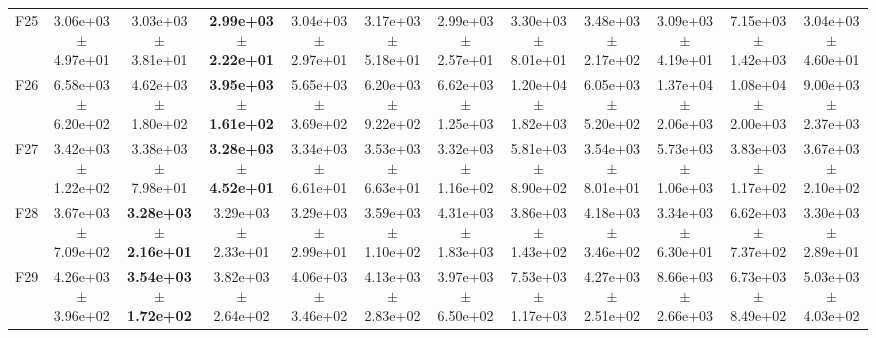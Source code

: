 \begin{table}
{\begin{tabular}{lccccccccccc}
F25 & 3.06e+03 $\pm$ 4.97e+01 & 3.03e+03 $\pm$ 3.81e+01 & \textbf{2.99e+03 $\pm$ 2.22e+01} & 3.04e+03 $\pm$ 2.97e+01 & 3.17e+03 $\pm$ 5.18e+01 & 2.99e+03 $\pm$ 2.57e+01 & 3.30e+03 $\pm$ 8.01e+01 & 3.48e+03 $\pm$ 2.17e+02 & 3.09e+03 $\pm$ 4.19e+01 & 7.15e+03 $\pm$ 1.42e+03 & 3.04e+03 $\pm$ 4.60e+01 \\
F26 & 6.58e+03 $\pm$ 6.20e+02 & 4.62e+03 $\pm$ 1.80e+02 & \textbf{3.95e+03 $\pm$ 1.61e+02} & 5.65e+03 $\pm$ 3.69e+02 & 6.20e+03 $\pm$ 9.22e+02 & 6.62e+03 $\pm$ 1.25e+03 & 1.20e+04 $\pm$ 1.82e+03 & 6.05e+03 $\pm$ 5.20e+02 & 1.37e+04 $\pm$ 2.06e+03 & 1.08e+04 $\pm$ 2.00e+03 & 9.00e+03 $\pm$ 2.37e+03 \\
F27 & 3.42e+03 $\pm$ 1.22e+02 & 3.38e+03 $\pm$ 7.98e+01 & \textbf{3.28e+03 $\pm$ 4.52e+01} & 3.34e+03 $\pm$ 6.61e+01 & 3.53e+03 $\pm$ 6.63e+01 & 3.32e+03 $\pm$ 1.16e+02 & 5.81e+03 $\pm$ 8.90e+02 & 3.54e+03 $\pm$ 8.01e+01 & 5.73e+03 $\pm$ 1.06e+03 & 3.83e+03 $\pm$ 1.17e+02 & 3.67e+03 $\pm$ 2.10e+02 \\
F28 & 3.67e+03 $\pm$ 7.09e+02 & \textbf{3.28e+03 $\pm$ 2.16e+01} & 3.29e+03 $\pm$ 2.33e+01 & 3.29e+03 $\pm$ 2.99e+01 & 3.59e+03 $\pm$ 1.10e+02 & 4.31e+03 $\pm$ 1.83e+03 & 3.86e+03 $\pm$ 1.43e+02 & 4.18e+03 $\pm$ 3.46e+02 & 3.34e+03 $\pm$ 6.30e+01 & 6.62e+03 $\pm$ 7.37e+02 & 3.30e+03 $\pm$ 2.89e+01 \\
F29 & 4.26e+03 $\pm$ 3.96e+02 & \textbf{3.54e+03 $\pm$ 1.72e+02} & 3.82e+03 $\pm$ 2.64e+02 & 4.06e+03 $\pm$ 3.46e+02 & 4.13e+03 $\pm$ 2.83e+02 & 3.97e+03 $\pm$ 6.50e+02 & 7.53e+03 $\pm$ 1.17e+03 & 4.27e+03 $\pm$ 2.51e+02 & 8.66e+03 $\pm$ 2.66e+03 & 6.73e+03 $\pm$ 8.49e+02 & 5.03e+03 $\pm$ 4.03e+02 \\
\bottomrule
\end{tabular}%
}
\end{table}
